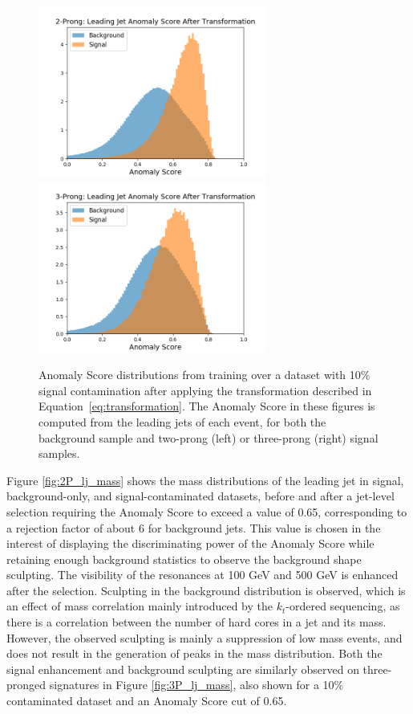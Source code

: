 \documentclass[11pt, a4paper]{article}
\begin{document}
\begin{figure}[H]
	\begin{center}
		\includegraphics[width=213pt]{imgs/bugfix/2Prong_Contaminated_10p0_J_Score_Multi_Lead_SaveForPaper.png}
		\includegraphics[width=213pt]{imgs/bugfix/3Prong_Contaminated_10p0_J_Score_Multi_Lead_SaveForPaper.png}
	\end{center}

	\caption{Anomaly Score distributions from training over a dataset with 10\% signal contamination after applying the transformation described in Equation~\ref{eq:transformation}. The Anomaly Score in these figures is computed from the leading jets of each event, for both the background sample and two-prong (left) or three-prong (right) signal samples.}

	\label{fig:score_transform}
\end{figure}

Figure \ref{fig:2P_lj_mass} shows the mass distributions of the leading jet in signal, background-only, and signal-contaminated datasets, before and after a jet-level selection requiring the Anomaly Score to exceed a value of 0.65, corresponding to a rejection factor of about 6 for background jets.
This value is chosen in the interest of displaying the discriminating power of the Anomaly Score while retaining enough background statistics to observe the background shape sculpting. 
The visibility of the resonances at 100 GeV and 500 GeV is enhanced after the selection. Sculpting in the background distribution is observed, which is an effect of mass correlation mainly introduced by the $k_{t}$-ordered sequencing, as there is a correlation between the number of hard cores in a jet and its mass. However, the observed sculpting is mainly a suppression of low mass events, and does not result in the generation of peaks in the mass distribution. Both the signal enhancement and background sculpting are similarly observed on three-pronged signatures in Figure \ref{fig:3P_lj_mass}, also shown for a 10\% contaminated dataset and an Anomaly Score cut of 0.65.  
\end{document}
